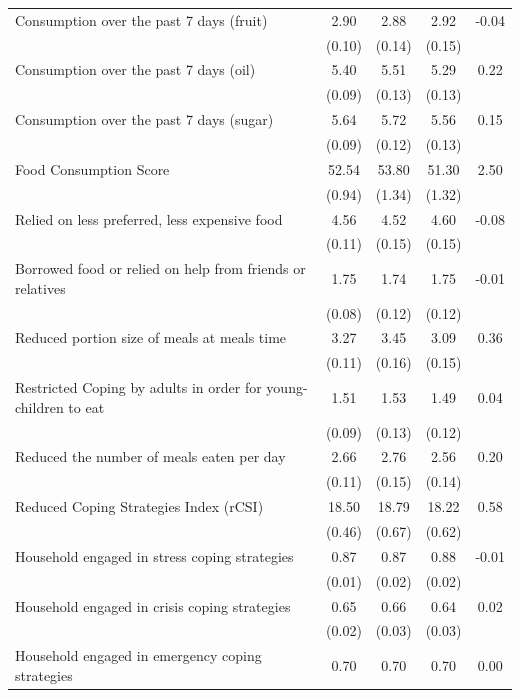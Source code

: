 \begin{tabular}{@{\extracolsep{5pt}}lcccc}
Consumption over the past 7 days (fruit)   & 2.90    & 2.88    & 2.92    & -0.04   \\
 & (0.10)  & (0.14)  & (0.15)  &  \\ [1ex]
Consumption over the past 7 days (oil)   & 5.40    & 5.51    & 5.29    & 0.22   \\
 & (0.09)  & (0.13)  & (0.13)  &  \\ [1ex]
Consumption over the past 7 days (sugar)   & 5.64    & 5.72    & 5.56    & 0.15   \\
 & (0.09)  & (0.12)  & (0.13)  &  \\ [1ex]
Food Consumption Score   & 52.54    & 53.80    & 51.30    & 2.50   \\
 & (0.94)  & (1.34)  & (1.32)  &  \\ [1ex]
Relied on less preferred, less expensive food   & 4.56    & 4.52    & 4.60    & -0.08   \\
 & (0.11)  & (0.15)  & (0.15)  &  \\ [1ex]
Borrowed food or relied on help from friends or relatives   & 1.75    & 1.74    & 1.75    & -0.01   \\
 & (0.08)  & (0.12)  & (0.12)  &  \\ [1ex]
Reduced portion size of meals at meals time   & 3.27    & 3.45    & 3.09    & 0.36   \\
 & (0.11)  & (0.16)  & (0.15)  &  \\ [1ex]
Restricted Coping by adults in order for young-children to eat   & 1.51    & 1.53    & 1.49    & 0.04   \\
 & (0.09)  & (0.13)  & (0.12)  &  \\ [1ex]
Reduced the number of meals eaten per day   & 2.66    & 2.76    & 2.56    & 0.20   \\
 & (0.11)  & (0.15)  & (0.14)  &  \\ [1ex]
Reduced Coping Strategies Index (rCSI)   & 18.50    & 18.79    & 18.22    & 0.58   \\
 & (0.46)  & (0.67)  & (0.62)  &  \\ [1ex]
Household engaged in stress coping strategies   & 0.87    & 0.87    & 0.88    & -0.01   \\
 & (0.01)  & (0.02)  & (0.02)  &  \\ [1ex]
Household engaged in crisis coping strategies   & 0.65    & 0.66    & 0.64    & 0.02   \\
 & (0.02)  & (0.03)  & (0.03)  &  \\ [1ex]
Household engaged in emergency coping strategies   & 0.70    & 0.70    & 0.70    & 0.00   \\

\end{tabular}
